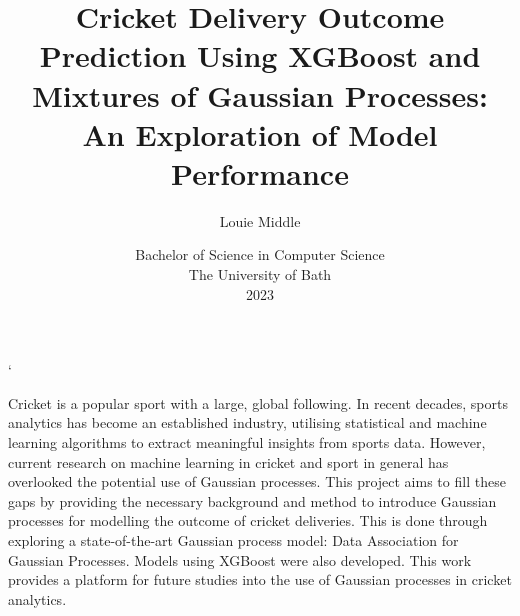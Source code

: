 \documentclass[12pt,a4paper]{report}
\title{\bf Cricket Delivery Outcome Prediction Using XGBoost and Mixtures of Gaussian Processes: An Exploration of Model Performance}
\author{Louie Middle}
\date{Bachelor of Science in Computer Science\\ 
      The University of Bath\\
      2023}
\theoremstyle{definition}
\begin{document}
\hypersetup{pageanchor=false}	



\lstMakeShortInline`

\setcounter{page}{0}

\maketitle
\newpage

\newpage

\newpage

\hypersetup{pageanchor=true}

\abstract
Cricket is a popular sport with a large, global following. In recent decades, sports analytics has become an established industry, utilising statistical and machine learning algorithms to extract meaningful insights from sports data. 
However, current research on machine learning in cricket and sport in general has overlooked the potential use of Gaussian processes. 
This project aims to fill these gaps by providing the necessary background and method to introduce Gaussian processes for modelling the outcome of cricket deliveries.
This is done through exploring a state-of-the-art Gaussian process model: Data Association for Gaussian Processes.
Models using XGBoost were also developed.
This work provides a platform for future studies into the use of Gaussian processes in cricket analytics.
\newpage
\end{document}
